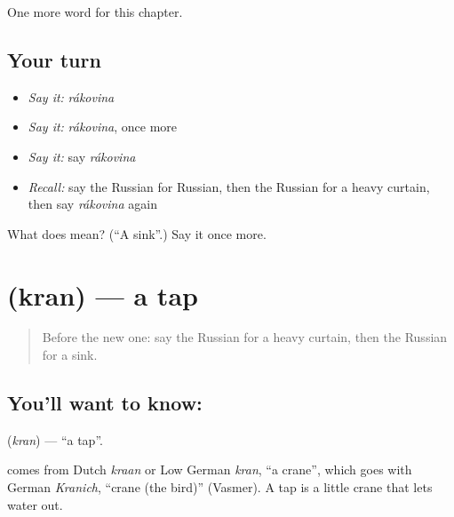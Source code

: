\begin{grammarlens}[title={What you've built}]
One more word for this chapter.
\end{grammarlens}

\subsection*{Your turn}
\begin{itemize}
\raggedright
  \item \emph{Say it:} \emph{rákovina}
  \item \emph{Say it:} \emph{rákovina}, once more
  \item \emph{Say it:} say \emph{rákovina}
  \item \emph{Recall:} say the Russian for Russian, then the Russian for a heavy curtain, then say \emph{rákovina} again
\end{itemize}

\begin{tcolorbox}[breakable,colback=teal!4,colframe=teal!35!black,title={Before you move on}]
What does  mean? (\textquotedblleft{}A sink\textquotedblright{}.) Say it once more.
\end{tcolorbox}
\section[\texorpdfstring{\ru{кран} (kran)}{кран (kran)}]{ (kran) — a tap}

\label{lesson:RU-C190-kran}



\begin{quote}
Before the new one: say the Russian for a heavy curtain, then the Russian for a sink.
\end{quote}

\subsection*{You'll want to know: }
\textbf{} (\emph{kran}) — \textquotedblleft{}a tap\textquotedblright{}.

\begin{cousinweb}
\textbf{} comes from Dutch \emph{kraan} or Low German \emph{kran}, \textquotedblleft{}a crane\textquotedblright{}, which goes with German \emph{Kranich}, \textquotedblleft{}crane (the bird)\textquotedblright{} (Vasmer). A tap is a little crane that lets water out.
\end{cousinweb}

